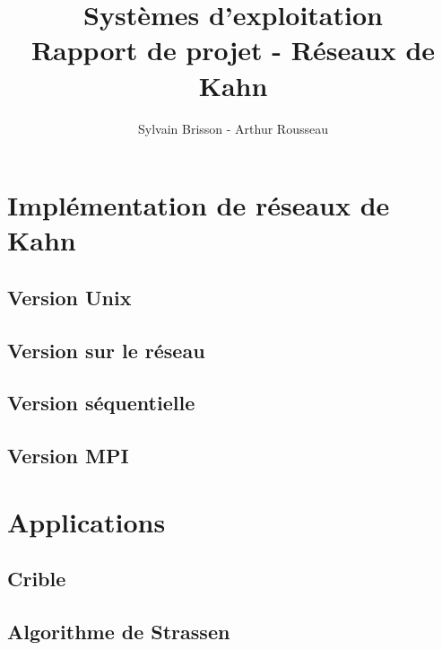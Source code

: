 \documentclass[a4paper]{article}
\title{Systèmes d'exploitation\\Rapport de projet - Réseaux de Kahn}
\author{Sylvain Brisson - Arthur Rousseau}
\date{}
\begin{document}
    \maketitle
    \noindent
    \section{Implémentation de réseaux de Kahn}
    \subsection{Version Unix}
    \subsection{Version sur le réseau}
    \subsection{Version séquentielle}
    \subsection{Version MPI}
    \section{Applications}
    \subsection{Crible}
    \subsection{Algorithme de Strassen}
\end{document}
